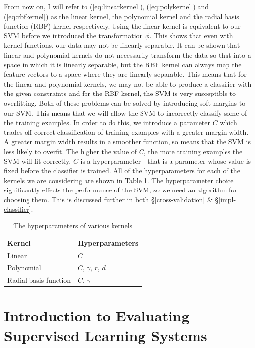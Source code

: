 \documentclass[12pt,a4paper,twoside,openright]{report}
\begin{document}
From now on, I will refer to (\ref{eq:linearkernel}), (\ref{eq:polykernel}) and (\ref{eq:rbfkernel}) as the linear kernel, the polynomial kernel and the radial basis function (RBF) kernel respectively. Using the linear kernel is equivalent to our SVM before we introduced the transformation $\phi$. This shows that even with kernel functions, our data may not be linearly separable. It can be shown that linear and polynomial kernels do not necessarily transform the data so that into a space in which it is linearly separable, but the RBF kernel can always map the feature vectors to a space where they are linearly separable. This means that for the linear and polynomial kernels, we may not be able to produce a classifier with the given constraints and for the RBF kernel, the SVM is very susceptible to overfitting. Both of these problems can be solved by introducing soft-margins to our SVM. This means that we will allow the SVM to incorrectly classify some of the training examples. In order to do this, we introduce a parameter $C$ which trades off correct classification of training examples with a greater margin width. A greater margin width results in a smoother function, so means that the SVM is less likely to overfit. The higher the value of $C$, the more training examples the SVM will fit correctly. $C$ is a hyperparameter - that is a parameter whose value is fixed before the classifier is trained. All of the hyperparameters for each of the kernels we are considering are shown in Table \ref{table:hyperparameters}. The hyperparameter choice significantly effects the performance of the SVM, so we need an algorithm for choosing them. This is discussed further in both \S\ref{cross-validation} \& \S\ref{impl-classifier}.

\begin{table}[]
	\centering
	\label{table:hyperparameters}
	\begin{tabular}{ll}
		\textbf{Kernel}       & \textbf{Hyperparameters} \\ \hline
		Linear                & $C$                      \\
		Polynomial            & $C$, $\gamma$, $r$, $d$  \\
		Radial basis function & $C$, $\gamma$             
	\end{tabular}
	\caption{The hyperparameters of various kernels}
\end{table}

\section{Introduction to Evaluating Supervised Learning Systems} \label{prep-eval}
\end{document}
